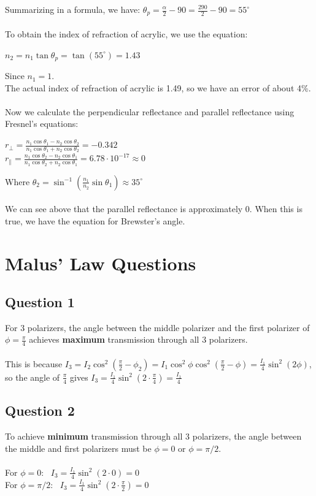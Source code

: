 \documentclass[a4paper, 11pt]{article}
\begin{document}
Summarizing in a formula, we have: $\theta_p = \frac{\alpha}{2} - 90 =\frac{290}{2} - 90 = 55^{\circ}$ \\
\\
To obtain the index of refraction of acrylic, we use the equation:
\begin{center}
$n_2 = n_1\tan\theta_p = \tan(55^{\circ}) = 1.43$
\end{center}

Since $n_1 = 1$. \\
The actual index of refraction of acrylic is 1.49, so we have an error of about 4\%. \\
\\
Now we calculate the perpendicular reflectance and parallel reflectance using Fresnel's equations:
\begin{center}
$r_{\perp}=\frac{n_1\cos\theta_1-n_2\cos\theta_2}{n_1\cos\theta_1+n_2\cos\theta_2} = -0.342$
\\
$r_{\parallel}=\frac{n_1\cos\theta_2-n_2\cos\theta_1}{n_1\cos\theta_2+n_2\cos\theta_1} = 6.78\cdot10^{-17} \approx 0$
\end{center}
Where $\theta_2 = \sin^{-1}(\frac{n_1}{n_2}\sin\theta_1) \approx 35^{\circ}$ \\
\\
We can see above that the parallel reflectance is approximately 0. When this is true, we have the equation for Brewster's angle.

\section*{Malus' Law Questions}

\subsection*{Question 1}
For 3 polarizers, the angle between the middle polarizer and the first polarizer of $\phi = \frac{\pi}{4}$  achieves \textbf{maximum} transmission through all 3 polarizers. \\
\\
This is because $I_3 = I_2\cos^{2}(\frac{\pi}{2} - \phi_2) = I_1\cos^{2}\phi \cos^{2}(\frac{\pi}{2} - \phi) = \frac{I_1}{4}\sin^{2}(2\phi)$, so the angle of $\frac{\pi}{4}$ gives $I_3 = \frac{I_1}{4}\sin^{2}(2 \cdot \frac{\pi}{4}) = \frac{I_1}{4}$

\subsection*{Question 2}
To achieve \textbf{minimum} transmission through all 3 polarizers, the angle between the middle and first polarizers must be $\phi = 0$ or $\phi = \pi/2$. \\
\\
For $\phi = 0$: \ $I_3 = \frac{I_1}{4}\sin^{2}(2 \cdot 0) = 0$ \\
For $\phi = \pi/2$: \ $I_3 = \frac{I_1}{4}\sin^{2}(2 \cdot \frac{\pi}{2}) = 0$
\end{document}

